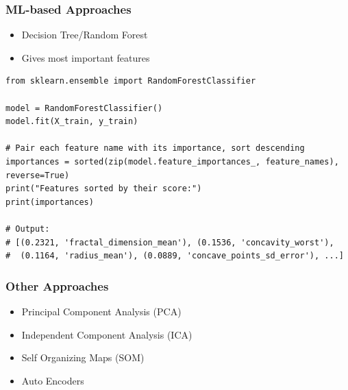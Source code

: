 %
\begin{frame}[fragile]\frametitle{ML-based Approaches}
	\begin{itemize}
	\item Decision Tree/Random Forest
	\item Gives most important features
	\end{itemize}
\begin{lstlisting}
from sklearn.ensemble import RandomForestClassifier

model = RandomForestClassifier()
model.fit(X_train, y_train)

# Pair each feature name with its importance, sort descending
importances = sorted(zip(model.feature_importances_, feature_names), reverse=True)
print("Features sorted by their score:")
print(importances)

# Output:
# [(0.2321, 'fractal_dimension_mean'), (0.1536, 'concavity_worst'),
#  (0.1164, 'radius_mean'), (0.0889, 'concave_points_sd_error'), ...]
\end{lstlisting}

\end{frame}

\begin{frame}[fragile]\frametitle{Other Approaches}
	\begin{itemize}
	\item Principal Component Analysis (PCA)
	\item Independent Component Analysis (ICA)
	\item Self Organizing Maps (SOM)
	\item Auto Encoders
	\end{itemize}
\end{frame}


